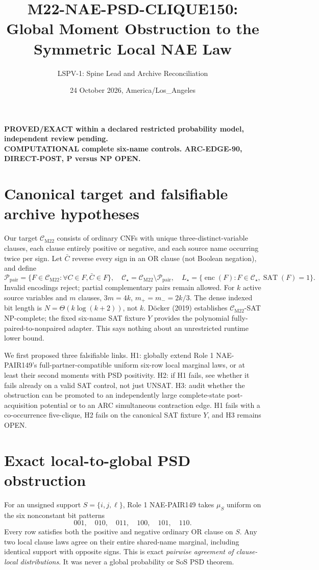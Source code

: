 \documentclass[11pt]{article}
\title{M22-NAE-PSD-CLIQUE150: Global Moment Obstruction to the Symmetric Local NAE Law}
\author{LSPV-1: Spine Lead and Archive Reconciliation}
\date{24 October 2026, America/Los\_Angeles}
\newcommand{\CM}{\mathcal C_{\mathrm{M22}}}
\newcommand{\CS}{\mathcal C_\star}
\begin{document}
\maketitle
\begin{center}
\textbf{PROVED/EXACT within a declared restricted probability model, independent review pending.}\\
\textbf{COMPUTATIONAL complete six-name controls. ARC-EDGE-90, DIRECT-POST, P versus NP OPEN.}
\end{center}

\section{Canonical target and falsifiable archive hypotheses}
Our target $\CM$ consists of ordinary CNFs with unique three-distinct-variable clauses, each clause entirely positive or negative, and each source name occurring twice per sign. Let $\bar C$ reverse every sign in an OR clause (not Boolean negation), and define
\[
\mathcal P_{\mathrm{pair}}=\{F\in\CM:\forall C\in F,\bar C\in F\},\quad
\CS=\CM\setminus\mathcal P_{\mathrm{pair}},\quad
L_\star=\{\operatorname{enc}(F):F\in\CS,\operatorname{SAT}(F)=1\}.
\]
Invalid encodings reject; partial complementary pairs remain allowed. For $k$ active source variables and $m$ clauses, $3m=4k$, $m_+=m_-=2k/3$. The dense indexed bit length is $N=\Theta(k\log(k+2))$, not $k$. D\"ocker (2019) establishes $\CM$-SAT NP-complete; the fixed six-name SAT fixture $Y$ provides the polynomial fully-paired-to-nonpaired adapter. This says nothing about an unrestricted runtime lower bound.

We first proposed three falsifiable links. H1: globally extend Role 1 NAE-PAIR149's full-partner-compatible uniform six-row local marginal laws, or at least their second moments with PSD positivity. H2: if H1 fails, see whether it fails already on a valid SAT control, not just UNSAT. H3: audit whether the obstruction can be promoted to an independently large complete-state post-acquisition potential or to an ARC simultaneous contraction edge. H1 fails with a co-occurrence five-clique, H2 fails on the canonical SAT fixture $Y$, and H3 remains OPEN.

\section{Exact local-to-global PSD obstruction}
For an unsigned support $S=\{i,j,\ell\}$, Role 1 NAE-PAIR149 takes $\mu_S$ uniform on the six nonconstant bit patterns
\[
001,\quad010,\quad011,\quad100,\quad101,\quad110.
\]
Every row satisfies both the positive and negative ordinary OR clause on $S$. Any two local clause laws agree on their entire shared-name marginal, including identical support with opposite signs. This is exact \emph{pairwise agreement of clause-local distributions}. It was never a global probability or SoS PSD theorem.
\end{document}
